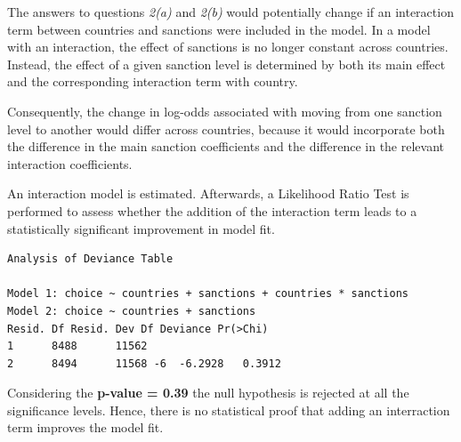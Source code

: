 \documentclass[12pt,letterpaper]{article}
\begin{document}
\noindent The answers to questions \emph{2(a)} and \emph{2(b)} would potentially change if an interaction term between countries and sanctions were included in the model. In a model with an interaction, the effect of sanctions is no longer constant across countries. Instead, the effect of a given sanction level is determined by both its main effect and the corresponding interaction term with country.
 
\noindent Consequently, the change in log-odds associated with moving from one sanction level to another would differ across countries, because it would incorporate both the difference in the main sanction coefficients and the difference in the relevant interaction coefficients.

\vspace{0.5cm}

\noindent An interaction model is estimated. Afterwards, a Likelihood Ratio Test is performed to assess whether the addition of the interaction term leads to a statistically significant improvement in model fit.

\vspace{0.5cm}


\vspace{0.5cm}
\begin{verbatim}
Analysis of Deviance Table

Model 1: choice ~ countries + sanctions + countries * sanctions
Model 2: choice ~ countries + sanctions
Resid. Df Resid. Dev Df Deviance Pr(>Chi)
1      8488      11562                     
2      8494      11568 -6  -6.2928   0.3912
\end{verbatim}

\vspace{0.5cm}

\noindent Considering the \textbf{p-value = 0.39} the null hypothesis is rejected at all the significance levels. Hence, there is no statistical proof that adding an interraction term improves the model fit.
\end{document}
